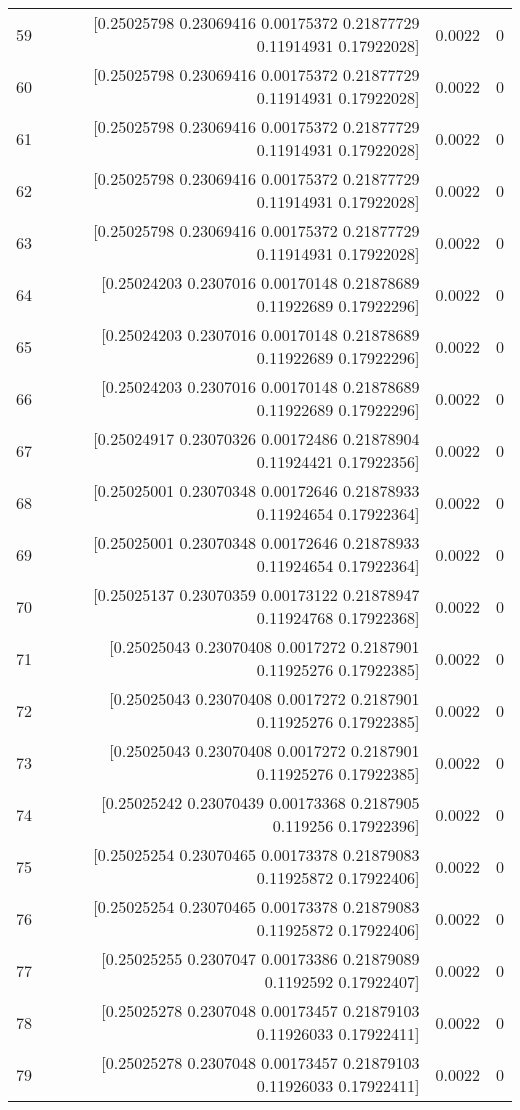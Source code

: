 \begin{longtable}{lrrr}
59 & [0.25025798 0.23069416 0.00175372 0.21877729 0.11914931 0.17922028] & 0.0022 & 0 \\
60 & [0.25025798 0.23069416 0.00175372 0.21877729 0.11914931 0.17922028] & 0.0022 & 0 \\
61 & [0.25025798 0.23069416 0.00175372 0.21877729 0.11914931 0.17922028] & 0.0022 & 0 \\
62 & [0.25025798 0.23069416 0.00175372 0.21877729 0.11914931 0.17922028] & 0.0022 & 0 \\
63 & [0.25025798 0.23069416 0.00175372 0.21877729 0.11914931 0.17922028] & 0.0022 & 0 \\
64 & [0.25024203 0.2307016  0.00170148 0.21878689 0.11922689 0.17922296] & 0.0022 & 0 \\
65 & [0.25024203 0.2307016  0.00170148 0.21878689 0.11922689 0.17922296] & 0.0022 & 0 \\
66 & [0.25024203 0.2307016  0.00170148 0.21878689 0.11922689 0.17922296] & 0.0022 & 0 \\
67 & [0.25024917 0.23070326 0.00172486 0.21878904 0.11924421 0.17922356] & 0.0022 & 0 \\
68 & [0.25025001 0.23070348 0.00172646 0.21878933 0.11924654 0.17922364] & 0.0022 & 0 \\
69 & [0.25025001 0.23070348 0.00172646 0.21878933 0.11924654 0.17922364] & 0.0022 & 0 \\
70 & [0.25025137 0.23070359 0.00173122 0.21878947 0.11924768 0.17922368] & 0.0022 & 0 \\
71 & [0.25025043 0.23070408 0.0017272  0.2187901  0.11925276 0.17922385] & 0.0022 & 0 \\
72 & [0.25025043 0.23070408 0.0017272  0.2187901  0.11925276 0.17922385] & 0.0022 & 0 \\
73 & [0.25025043 0.23070408 0.0017272  0.2187901  0.11925276 0.17922385] & 0.0022 & 0 \\
74 & [0.25025242 0.23070439 0.00173368 0.2187905  0.119256   0.17922396] & 0.0022 & 0 \\
75 & [0.25025254 0.23070465 0.00173378 0.21879083 0.11925872 0.17922406] & 0.0022 & 0 \\
76 & [0.25025254 0.23070465 0.00173378 0.21879083 0.11925872 0.17922406] & 0.0022 & 0 \\
77 & [0.25025255 0.2307047  0.00173386 0.21879089 0.1192592  0.17922407] & 0.0022 & 0 \\
78 & [0.25025278 0.2307048  0.00173457 0.21879103 0.11926033 0.17922411] & 0.0022 & 0 \\
79 & [0.25025278 0.2307048  0.00173457 0.21879103 0.11926033 0.17922411] & 0.0022 & 0 \\

\end{longtable}
